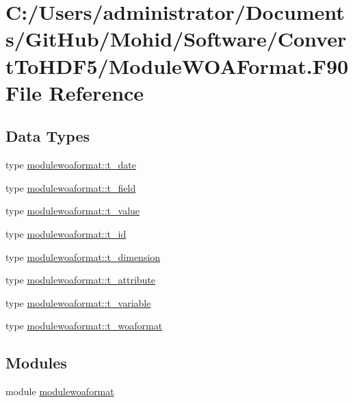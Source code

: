 \hypertarget{_module_w_o_a_format_8_f90}{}\section{C\+:/\+Users/administrator/\+Documents/\+Git\+Hub/\+Mohid/\+Software/\+Convert\+To\+H\+D\+F5/\+Module\+W\+O\+A\+Format.F90 File Reference}
\label{_module_w_o_a_format_8_f90}
\subsection*{Data Types}
\begin{DoxyCompactItemize}
\item 
type \mbox{\hyperlink{structmodulewoaformat_1_1t__date}{modulewoaformat\+::t\+\_\+date}}
\item 
type \mbox{\hyperlink{structmodulewoaformat_1_1t__field}{modulewoaformat\+::t\+\_\+field}}
\item 
type \mbox{\hyperlink{structmodulewoaformat_1_1t__value}{modulewoaformat\+::t\+\_\+value}}
\item 
type \mbox{\hyperlink{structmodulewoaformat_1_1t__id}{modulewoaformat\+::t\+\_\+id}}
\item 
type \mbox{\hyperlink{structmodulewoaformat_1_1t__dimension}{modulewoaformat\+::t\+\_\+dimension}}
\item 
type \mbox{\hyperlink{structmodulewoaformat_1_1t__attribute}{modulewoaformat\+::t\+\_\+attribute}}
\item 
type \mbox{\hyperlink{structmodulewoaformat_1_1t__variable}{modulewoaformat\+::t\+\_\+variable}}
\item 
type \mbox{\hyperlink{structmodulewoaformat_1_1t__woaformat}{modulewoaformat\+::t\+\_\+woaformat}}
\end{DoxyCompactItemize}
\subsection*{Modules}
\begin{DoxyCompactItemize}
\item 
module \mbox{\hyperlink{namespacemodulewoaformat}{modulewoaformat}}
\end{DoxyCompactItemize}
